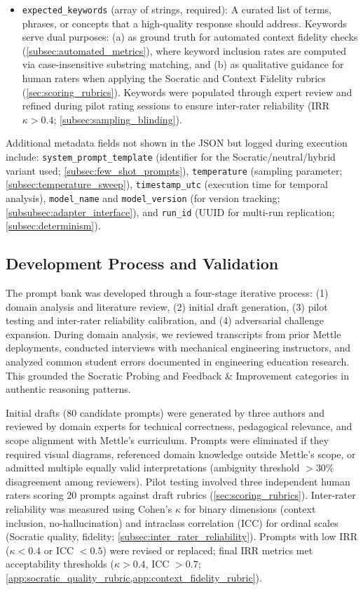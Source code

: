 \begin{itemize}[leftmargin=*]
    \item \texttt{expected\_keywords} (array of strings, required): A curated list of terms, phrases, or concepts that a high-quality response should address. Keywords serve dual purposes: (a) as ground truth for automated context fidelity checks (\cref{subsec:automated_metrics}), where keyword inclusion rates are computed via case-insensitive substring matching, and (b) as qualitative guidance for human raters when applying the Socratic and Context Fidelity rubrics (\cref{sec:scoring_rubrics}). Keywords were populated through expert review and refined during pilot rating sessions to ensure inter-rater reliability (IRR $\kappa > 0.4$; \cref{subsec:sampling_blinding}).
\end{itemize}

Additional metadata fields not shown in the JSON but logged during execution include: \texttt{system\_prompt\_template} (identifier for the Socratic/neutral/hybrid variant used; \cref{subsec:few_shot_prompts}), \texttt{temperature} (sampling parameter; \cref{subsec:temperature_sweep}), \texttt{timestamp\_utc} (execution time for temporal analysis), \texttt{model\_name} and \texttt{model\_version} (for version tracking; \cref{subsubsec:adapter_interface}), and \texttt{run\_id} (UUID for multi-run replication; \cref{subsec:determinism}).

\subsection{Development Process and Validation}
\label{app:prompts_development}

The prompt bank was developed through a four-stage iterative process: (1) domain analysis and literature review, (2) initial draft generation, (3) pilot testing and inter-rater reliability calibration, and (4) adversarial challenge expansion. During domain analysis, we reviewed transcripts from prior Mettle deployments, conducted interviews with mechanical engineering instructors, and analyzed common student errors documented in engineering education research. This grounded the Socratic Probing and Feedback \& Improvement categories in authentic reasoning patterns.

Initial drafts (80 candidate prompts) were generated by three authors and reviewed by domain experts for technical correctness, pedagogical relevance, and scope alignment with Mettle's curriculum. Prompts were eliminated if they required visual diagrams, referenced domain knowledge outside Mettle's scope, or admitted multiple equally valid interpretations (ambiguity threshold $>$30\% disagreement among reviewers). Pilot testing involved three independent human raters scoring 20 prompts against draft rubrics (\cref{sec:scoring_rubrics}). Inter-rater reliability was measured using Cohen's $\kappa$ for binary dimensions (context inclusion, no-hallucination) and intraclass correlation (ICC) for ordinal scales (Socratic quality, fidelity; \cref{subsec:inter_rater_reliability}). Prompts with low IRR ($\kappa < 0.4$ or ICC $< 0.5$) were revised or replaced; final IRR metrics met acceptability thresholds ($\kappa > 0.4$, ICC $> 0.7$; \cref{app:socratic_quality_rubric,app:context_fidelity_rubric}).

